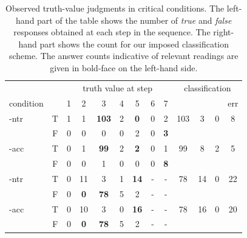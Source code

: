 \documentclass[fleqn,reqno,10pt]{article}
\newcommand{\lit}{\acro{lit}}
\newcommand{\glb}{\acro{glb}}
\newcommand{\loc}{\acro{loc}}
\newcommand{\as}{\acro{as}}
\renewcommand{\es}{\acro{es}}
\begin{document}
\begin{table}
  \centering
  \begin{tabular}{lcccccccc@{\hskip 0.6cm}cccc}
    && \multicolumn{7}{c}{truth value at step}
    & \multicolumn{4}{c}{classification}
    \\ \cmidrule(l){3-9} \cmidrule(r){10-13}
    condition &
    & 1
    & 2
    & 3
    & 4
    & 5
    & 6
    & 7
    & \lit
    & \loc
    & \glb
    & err \\ \midrule
    \as-ntr 
    & T & 1 & 1 & \textbf{103} & 2 & \textbf{0} & 0 & 2 
    & 103 & 3 & 0 & 8 \\
    & F & 0 & 0 & 0 & 0 & 2 & 0 & \textbf{3} \\ 
    \addlinespace[0.25cm]
    \as-acc
    & T & 0 & 1 & \textbf{99} & 2 & \textbf{2} & 0 & 1 
    & 99 & 8 & 2 & 5 \\
    & F & 0 & 0 & 1 & 0 & 0 & 0 & \textbf{8} \\
    \addlinespace[0.25cm]
    \es-ntr
    & T & 0 & 11 & 3 & 1 & \textbf{14} & - & - 
    & 78 & 14 & 0 & 22 \\
    & F & 0 & \textbf{0} & \textbf{78} & 5 & 2 & - & - \\
    \addlinespace[0.25cm]
    \es-acc
    & T & 0 & 10 & 3 & 0 & \textbf{16} & - & - 
    & 78 & 16 & 0 & 20 \\
    & F & 0 & \textbf{0} & \textbf{78} & 5 & 2 & - & -
  \end{tabular}
  \caption{Observed truth-value judgments in critical conditions. The
    left-hand part of the table shows the number of \emph{true} and
    \emph{false} responses obtained at each step in the sequence. The
    right-hand part shows the count for our imposed classification
    scheme. The answer counts indicative of relevant readings are
    given in bold-face on the left-hand side.}
  \label{tab:count_data_CC}
\end{table}


%
\end{document}

